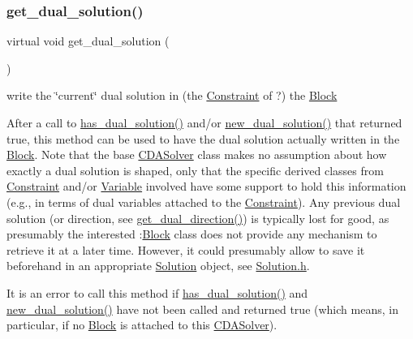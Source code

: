 \subsubsection{\texorpdfstring{get\+\_\+dual\+\_\+solution()}{get\_dual\_solution()}}
{\footnotesize\ttfamily virtual void get\+\_\+dual\+\_\+solution (\begin{DoxyParamCaption}\item[{void}]{ }\end{DoxyParamCaption})\hspace{0.3cm}{\ttfamily [pure virtual]}}



write the \char`\"{}current\char`\"{} dual solution in (the \mbox{\hyperlink{class_s_m_spp__di__unipi__it_1_1_constraint}{Constraint}} of ?) the \mbox{\hyperlink{class_s_m_spp__di__unipi__it_1_1_block}{Block}} 

After a call to \mbox{\hyperlink{class_s_m_spp__di__unipi__it_1_1_c_d_a_solver_a26970b0da7f4f7b56bcfc890983d9a40}{has\+\_\+dual\+\_\+solution()}} and/or \mbox{\hyperlink{class_s_m_spp__di__unipi__it_1_1_c_d_a_solver_a8c650415b6673c33692c363abdfdef00}{new\+\_\+dual\+\_\+solution()}} that returned true, this method can be used to have the dual solution actually written in the \mbox{\hyperlink{class_s_m_spp__di__unipi__it_1_1_block}{Block}}. Note that the base \mbox{\hyperlink{class_s_m_spp__di__unipi__it_1_1_c_d_a_solver}{C\+D\+A\+Solver}} class makes no assumption about how exactly a dual solution is shaped, only that the specific derived classes from \mbox{\hyperlink{class_s_m_spp__di__unipi__it_1_1_constraint}{Constraint}} and/or \mbox{\hyperlink{class_s_m_spp__di__unipi__it_1_1_variable}{Variable}} involved have some support to hold this information (e.\+g., in terms of dual variables attached to the \mbox{\hyperlink{class_s_m_spp__di__unipi__it_1_1_constraint}{Constraint}}). Any previous dual solution (or direction, see \mbox{\hyperlink{class_s_m_spp__di__unipi__it_1_1_c_d_a_solver_a145672680f07ca7eef090900b8d6ddcf}{get\+\_\+dual\+\_\+direction()}}) is typically lost for good, as presumably the interested \+:\mbox{\hyperlink{class_s_m_spp__di__unipi__it_1_1_block}{Block}} class does not provide any mechanism to retrieve it at a later time. However, it could presumably allow to save it beforehand in an appropriate \mbox{\hyperlink{class_s_m_spp__di__unipi__it_1_1_solution}{Solution}} object, see \mbox{\hyperlink{_solution_8h}{Solution.\+h}}.

It is an error to call this method if \mbox{\hyperlink{class_s_m_spp__di__unipi__it_1_1_c_d_a_solver_a26970b0da7f4f7b56bcfc890983d9a40}{has\+\_\+dual\+\_\+solution()}} and \mbox{\hyperlink{class_s_m_spp__di__unipi__it_1_1_c_d_a_solver_a8c650415b6673c33692c363abdfdef00}{new\+\_\+dual\+\_\+solution()}} have not been called and returned true (which means, in particular, if no \mbox{\hyperlink{class_s_m_spp__di__unipi__it_1_1_block}{Block}} is attached to this \mbox{\hyperlink{class_s_m_spp__di__unipi__it_1_1_c_d_a_solver}{C\+D\+A\+Solver}}).

